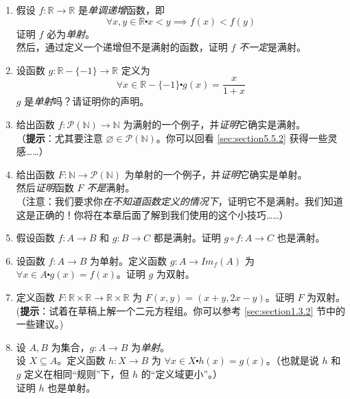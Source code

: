 \begin{enumerate}[label=(\arabic*)]
    \item 假设 $f : \mathbb{R} \to \mathbb{R}$ 是\emph{单调递增}函数，即
        \[\forall x, y \in \mathbb{R} \centerdot x < y \implies f(x) < f(y)\]
        证明 $f$ 必为\emph{单射}。\\
        然后，通过定义一个递增但不是满射的函数，证明 $f$ \emph{不一定}是满射。
    \item 设函数 $g : \mathbb{R} - \{-1\} \to \mathbb{R}$ 定义为 
        \[\forall x \in \mathbb{R} - \{-1\} \centerdot g(x) = \frac{x}{1+x}\]
        $g$ 是\emph{单射}吗？请证明你的声明。
    \item 给出函数 $f : \mathcal{P}(\mathbb{N}) \to \mathbb{N}$ 为满射的一个例子，并\emph{证明}它确实是满射。\\
        （\textbf{提示}：尤其要注意 $\varnothing \in \mathcal{P}(\mathbb{N})$。你可以回看 \ref{sec:section5.5.2} 获得一些灵感……）
    \item 给出函数 $F : \mathbb{N} \to \mathcal{P}(\mathbb{N})$ 为单射的一个例子，并\emph{证明}它确实是单射。\\
        然后\emph{证明}函数 $F$ \emph{不是}满射。\\
        （注意：我们要求你\emph{在不知道函数定义的情况下}，证明它不是满射。我们知道这是正确的！你将在本章后面了解到我们使用的这个小技巧……）\label{exc:exercises7.4.4}
    \item 假设函数 $f : A \to B$ 和 $g : B \to C$ 都是满射。证明 $g \circ f:A \to C$ 也是满射。
    \item 设函数 $f : A \to B$ 为单射。定义函数 $g : A \to Im_f (A)$ 为 $\forall x \in A \centerdot g(x) = f(x)$。证明 $g$ 为双射。
    \item 定义函数 $F:\mathbb{R} \times \mathbb{R} \to \mathbb{R} \times \mathbb{R}$ 为 $F(x, y) = (x+y, 2x-y)$。证明 $F$ 为双射。\\
        (\textbf{提示}：试着在草稿上解一个二元方程组。你可以参考 \ref{sec:section1.3.2} 节中的一些建议。)
    \item 设 $A, B$ 为集合，$g: A \to B$ 为\emph{单射}。\\
        设 $X \subseteq A$。定义函数 $h : X \to B$ 为 $\forall x \in X \centerdot h(x) = g(x)$。（也就是说 $h$ 和 $g$ 定义在相同``规则''下，但 $h$ 的``定义域更小''。）\\
        证明 $h$ 也是单射。
\end{enumerate}